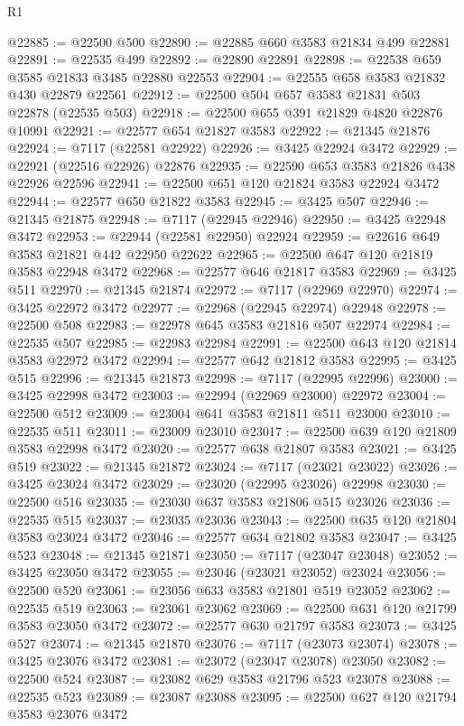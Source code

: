 \begin{lexlean}{R1}
\begin{coremodule}
@22885 := @22500 @500
@22890 := @22885 @660 @3583 @21834 @499 @22881
@22891 := @22535 @499
@22892 := @22890 @22891
@22898 := @22538 @659 @3585 @21833 @3485 @22880 @22553
@22904 := @22555 @658 @3583 @21832 @430 @22879 @22561
@22912 := @22500 @504 @657 @3583 @21831 @503 @22878 (@22535 @503)
@22918 := @22500 @655 @391 @21829 @4820 @22876 @10991
@22921 := @22577 @654 @21827 @3583
@22922 := @21345 @21876
@22924 := @7117 (@22581 @22922)
@22926 := @3425 @22924 @3472
@22929 := @22921 (@22516 @22926) @22876
@22935 := @22590 @653 @3583 @21826 @438 @22926 @22596
@22941 := @22500 @651 @120 @21824 @3583 @22924 @3472
@22944 := @22577 @650 @21822 @3583
@22945 := @3425 @507
@22946 := @21345 @21875
@22948 := @7117 (@22945 @22946)
@22950 := @3425 @22948 @3472
@22953 := @22944 (@22581 @22950) @22924
@22959 := @22616 @649 @3583 @21821 @442 @22950 @22622
@22965 := @22500 @647 @120 @21819 @3583 @22948 @3472
@22968 := @22577 @646 @21817 @3583
@22969 := @3425 @511
@22970 := @21345 @21874
@22972 := @7117 (@22969 @22970)
@22974 := @3425 @22972 @3472
@22977 := @22968 (@22945 @22974) @22948
@22978 := @22500 @508
@22983 := @22978 @645 @3583 @21816 @507 @22974
@22984 := @22535 @507
@22985 := @22983 @22984
@22991 := @22500 @643 @120 @21814 @3583 @22972 @3472
@22994 := @22577 @642 @21812 @3583
@22995 := @3425 @515
@22996 := @21345 @21873
@22998 := @7117 (@22995 @22996)
@23000 := @3425 @22998 @3472
@23003 := @22994 (@22969 @23000) @22972
@23004 := @22500 @512
@23009 := @23004 @641 @3583 @21811 @511 @23000
@23010 := @22535 @511
@23011 := @23009 @23010
@23017 := @22500 @639 @120 @21809 @3583 @22998 @3472
@23020 := @22577 @638 @21807 @3583
@23021 := @3425 @519
@23022 := @21345 @21872
@23024 := @7117 (@23021 @23022)
@23026 := @3425 @23024 @3472
@23029 := @23020 (@22995 @23026) @22998
@23030 := @22500 @516
@23035 := @23030 @637 @3583 @21806 @515 @23026
@23036 := @22535 @515
@23037 := @23035 @23036
@23043 := @22500 @635 @120 @21804 @3583 @23024 @3472
@23046 := @22577 @634 @21802 @3583
@23047 := @3425 @523
@23048 := @21345 @21871
@23050 := @7117 (@23047 @23048)
@23052 := @3425 @23050 @3472
@23055 := @23046 (@23021 @23052) @23024
@23056 := @22500 @520
@23061 := @23056 @633 @3583 @21801 @519 @23052
@23062 := @22535 @519
@23063 := @23061 @23062
@23069 := @22500 @631 @120 @21799 @3583 @23050 @3472
@23072 := @22577 @630 @21797 @3583
@23073 := @3425 @527
@23074 := @21345 @21870
@23076 := @7117 (@23073 @23074)
@23078 := @3425 @23076 @3472
@23081 := @23072 (@23047 @23078) @23050
@23082 := @22500 @524
@23087 := @23082 @629 @3583 @21796 @523 @23078
@23088 := @22535 @523
@23089 := @23087 @23088
@23095 := @22500 @627 @120 @21794 @3583 @23076 @3472

\end{coremodule}
\end{lexlean}
